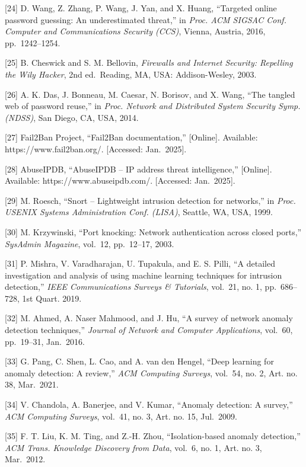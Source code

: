 \documentclass[
  a4paper]{report}
\begin{document}
{[}24{]} D. Wang, Z. Zhang, P. Wang, J. Yan, and X. Huang, ``Targeted
online password guessing: An underestimated threat,'' in \emph{Proc. ACM
SIGSAC Conf. Computer and Communications Security (CCS)}, Vienna,
Austria, 2016, pp.~1242--1254.

{[}25{]} B. Cheswick and S. M. Bellovin, \emph{Firewalls and Internet
Security: Repelling the Wily Hacker}, 2nd ed.~Reading, MA, USA:
Addison-Wesley, 2003.

{[}26{]} A. K. Das, J. Bonneau, M. Caesar, N. Borisov, and X. Wang,
``The tangled web of password reuse,'' in \emph{Proc. Network and
Distributed System Security Symp. (NDSS)}, San Diego, CA, USA, 2014.

{[}27{]} Fail2Ban Project, ``Fail2Ban documentation,'' {[}Online{]}.
Available: https://www.fail2ban.org/. {[}Accessed: Jan.~2025{]}.

{[}28{]} AbuseIPDB, ``AbuseIPDB -- IP address threat intelligence,''
{[}Online{]}. Available: https://www.abuseipdb.com/. {[}Accessed:
Jan.~2025{]}.

{[}29{]} M. Roesch, ``Snort -- Lightweight intrusion detection for
networks,'' in \emph{Proc. USENIX Systems Administration Conf. (LISA)},
Seattle, WA, USA, 1999.

{[}30{]} M. Krzywinski, ``Port knocking: Network authentication across
closed ports,'' \emph{SysAdmin Magazine}, vol.~12, pp.~12--17, 2003.

{[}31{]} P. Mishra, V. Varadharajan, U. Tupakula, and E. S. Pilli, ``A
detailed investigation and analysis of using machine learning techniques
for intrusion detection,'' \emph{IEEE Communications Surveys \&
Tutorials}, vol.~21, no. 1, pp.~686--728, 1st Quart. 2019.

{[}32{]} M. Ahmed, A. Naser Mahmood, and J. Hu, ``A survey of network
anomaly detection techniques,'' \emph{Journal of Network and Computer
Applications}, vol.~60, pp.~19--31, Jan.~2016.

{[}33{]} G. Pang, C. Shen, L. Cao, and A. van den Hengel, ``Deep
learning for anomaly detection: A review,'' \emph{ACM Computing
Surveys}, vol.~54, no. 2, Art. no. 38, Mar.~2021.

{[}34{]} V. Chandola, A. Banerjee, and V. Kumar, ``Anomaly detection: A
survey,'' \emph{ACM Computing Surveys}, vol.~41, no. 3, Art. no. 15,
Jul.~2009.

{[}35{]} F. T. Liu, K. M. Ting, and Z.-H. Zhou, ``Isolation-based
anomaly detection,'' \emph{ACM Trans. Knowledge Discovery from Data},
vol.~6, no. 1, Art. no. 3, Mar.~2012.
\end{document}
